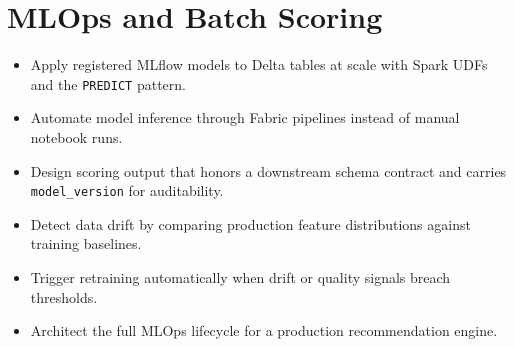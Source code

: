 \chapter{MLOps and Batch Scoring}
%

\begin{objectives}
\begin{itemize}
    \item Apply registered MLflow models to Delta tables at scale with Spark UDFs and the \texttt{PREDICT} pattern.
    \item Automate model inference through Fabric pipelines instead of manual notebook runs.
    \item Design scoring output that honors a downstream schema contract and carries \texttt{model\_version} for auditability.
    \item Detect data drift by comparing production feature distributions against training baselines.
    \item Trigger retraining automatically when drift or quality signals breach thresholds.
    \item Architect the full MLOps lifecycle for a production recommendation engine.
\end{itemize}
\end{objectives}

